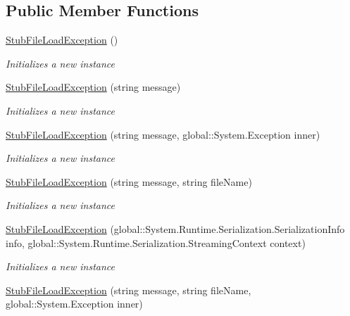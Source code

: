 \subsection*{Public Member Functions}
\begin{DoxyCompactItemize}
\item 
\hyperlink{class_system_1_1_i_o_1_1_fakes_1_1_stub_file_load_exception_a32ffb2e0724cdd1f65e5acbc2ce8e05b}{Stub\-File\-Load\-Exception} ()
\begin{DoxyCompactList}\small\item\em Initializes a new instance\end{DoxyCompactList}\item 
\hyperlink{class_system_1_1_i_o_1_1_fakes_1_1_stub_file_load_exception_aaa4b918e5169690b0de600442e7a944f}{Stub\-File\-Load\-Exception} (string message)
\begin{DoxyCompactList}\small\item\em Initializes a new instance\end{DoxyCompactList}\item 
\hyperlink{class_system_1_1_i_o_1_1_fakes_1_1_stub_file_load_exception_a24eb29836c9567b7770a0d443fa2c4c4}{Stub\-File\-Load\-Exception} (string message, global\-::\-System.\-Exception inner)
\begin{DoxyCompactList}\small\item\em Initializes a new instance\end{DoxyCompactList}\item 
\hyperlink{class_system_1_1_i_o_1_1_fakes_1_1_stub_file_load_exception_a68be838bf3dd346efbdcc162429da01b}{Stub\-File\-Load\-Exception} (string message, string file\-Name)
\begin{DoxyCompactList}\small\item\em Initializes a new instance\end{DoxyCompactList}\item 
\hyperlink{class_system_1_1_i_o_1_1_fakes_1_1_stub_file_load_exception_a6852dfcdf4426147ac27c7f4de9bec6b}{Stub\-File\-Load\-Exception} (global\-::\-System.\-Runtime.\-Serialization.\-Serialization\-Info info, global\-::\-System.\-Runtime.\-Serialization.\-Streaming\-Context context)
\begin{DoxyCompactList}\small\item\em Initializes a new instance\end{DoxyCompactList}\item 
\hyperlink{class_system_1_1_i_o_1_1_fakes_1_1_stub_file_load_exception_ac664d37f35a9d6889196b038f6a8563d}{Stub\-File\-Load\-Exception} (string message, string file\-Name, global\-::\-System.\-Exception inner)

\end{DoxyCompactItemize}
